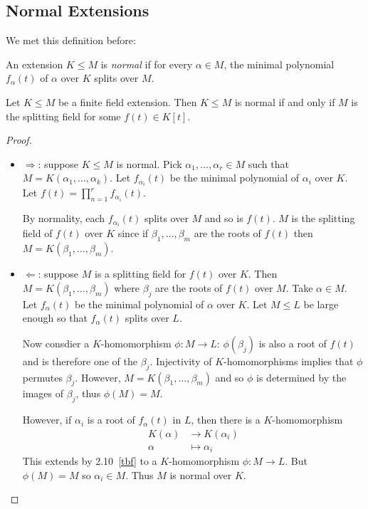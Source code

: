 \documentclass[a4paper]{article}
\begin{document}
\subsection{Normal Extensions}

We met this definition before:

\begin{definition}
  An extension \(K \leq M\) is \emph{normal} if for every \(\alpha \in M\), the minimal polynomial \(f_\alpha(t)\) of \(\alpha\) over \(K\) splits over \(M\).
\end{definition}

\begin{theorem}
  Let \(K \leq M\) be a finite field extension. Then \(K \leq M\) is normal if and only if \(M\) is the splitting field for some \(f(t) \in K[t]\).
\end{theorem}

\begin{proof}\leavevmode
  \begin{itemize}
  \item \(\Rightarrow\): suppose \(K \leq M\) is normal. Pick \(\alpha_1, \dots, \alpha_r \in M\) such that \(M = K(\alpha_1, \dots, \alpha_k)\). Let \(f_{\alpha_i}(t)\) be the minimal polynomial of \(\alpha_i\) over \(K\). Let \(f(t) = \prod_{n = 1}^{r} f_{\alpha_i}(t)\).

    By normality, each \(f_{\alpha_i}(t)\) splits over \(M\) and so is \(f(t)\). \(M\) is the splitting field of \(f(t)\) over \(K\) since if \(\beta_1, \dots, \beta_m\) are the roots of \(f(t)\) then \(M = K(\beta_1, \dots, \beta_m)\).
  \item \(\Leftarrow\): suppose \(M\) is a splitting field for \(f(t)\) over \(K\). Then \(M = K(\beta_1, \dots, \beta_m)\) where \(\beta_j\) are the roots of \(f(t)\) over \(M\). Take \(\alpha \in M\). Let \(f_\alpha(t)\) be the minimal polynomial of \(\alpha\) over \(K\). Let \(M \leq L\) be large enough so that \(f_\alpha(t)\) splits over \(L\).

    Now consdier a \(K\)-homomorphism \(\phi: M \to L\): \(\phi(\beta_j)\) is also a root of \(f(t)\) and is therefore one of the \(\beta_j\). Injectivity of \(K\)-homomorphisms implies that \(\phi\) permutes \(\beta_j\). However, \(M = K(\beta_1, \dots, \beta_m)\) and so \(\phi\) is determined by the images of \(\beta_j\), thus \(\phi(M) = M\).

    However, if \(\alpha_i\) is a root of \(f_\alpha(t)\) in \(L\), then there is a \(K\)-homomorphism
    \begin{align*}
      K(\alpha) &\to K(\alpha_i) \\
      \alpha &\mapsto \alpha_i
    \end{align*}
    This extends by 2.10~\ref{tbf} to a \(K\)-homomorphism \(\phi: M \to L\). But \(\phi(M) = M\) so \(\alpha_i \in M\). Thus \(M\) is normal over \(K\).
  \end{itemize}
\end{proof}
\end{document}
